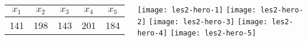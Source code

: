   \begin{columns}[c]
    \begin{center}
      \begin{tabular}{|c|c|c|c|c|}
        \hline
        $x_1$ & $x_2$ & $x_3$ & $x_4$ & $x_5$ \\
        \hline
        141 & 198 & 143 & 201 & 184 \\
        \hline
      \end{tabular}
    \end{center}
    \begin{center}
      \texttt{[image: les2-hero-1]}
      \texttt{[image: les2-hero-2]}
      \texttt{[image: les2-hero-3]}
      \texttt{[image: les2-hero-4]}
      \texttt{[image: les2-hero-5]}
    \end{center}
  \end{columns}
